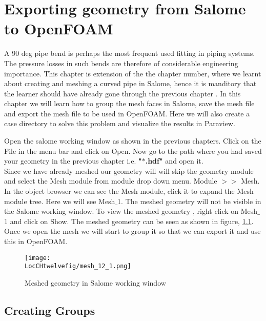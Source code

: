 \chapter{Exporting geometry from Salome to OpenFOAM}
\thispagestyle{empty}
\label{sec:chap12}
\newcommand{\LocCHtwelvefig}{\Origin/CHAPTERS/chap12/figures}

A 90 deg pipe bend is perhaps the most frequent used fitting in piping systems. The pressure losses in such bends are therefore of considerable engineering importance. This chapter is extension of the the chapter number, where we learnt about creating and meshing a curved pipe in Salome, hence it is manditory that the learner should have already gone through the previous chapter . In this chapter we will learn how to group the mesh faces in Salome, save the mesh file and export the mesh file to be used in OpenFOAM. Here we will also create a case directory to solve this problem and visualize the results in Paraview. \newline

Open the salome working window as shown in the previous chapters. Click on the File in the menu bar and click on Open. Now go to the path where you had saved your geometry in the previous chapter i.e. \textbf{"$*$.hdf"} and open it. \\

Since we have already meshed our geometry will will skip the geometry module and select the Mesh module from module drop down menu. Module $>>$ Mesh. In the object browser we can see the Mesh module, click it to expand the Mesh module tree. Here we will see Mesh$\_$1. The meshed geometry will not be visible in the Salome working window. To view the meshed geometry , right click on Mesh$\_$1 and click on Show. The meshed geometry can be seen as shown in figure, \ref{mesh_1}. Once we open the mesh we will start to group it so that we can export it and use this in OpenFOAM. 

\begin{figure}[h]  
\centering
\texttt{[image: \\LocCHtwelvefig/mesh\_12\_1.png]}
\caption{Meshed geometry in Salome working window}
\label{mesh_1}
\end{figure}   

\section{Creating Groups}

